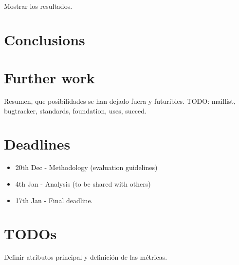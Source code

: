 \documentclass[11pt]{scrartcl}
\begin{document}
Mostrar los resultados.

\section{Conclusions}

\section{Further work}

Resumen, que posibilidades se han dejado fuera y futuribles.
TODO: maillist, bugtracker, standards, foundation, uses, succed.

\section{Deadlines}

\begin{itemize}
    \item 20th Dec - Methodology (evaluation guidelines)
    \item 4th Jan - Analysis (to be shared with others)
    \item 17th Jan - Final deadline.
\end{itemize}

\section{TODOs}

Definir atributos principal y definición de las métricas.
\end{document}
